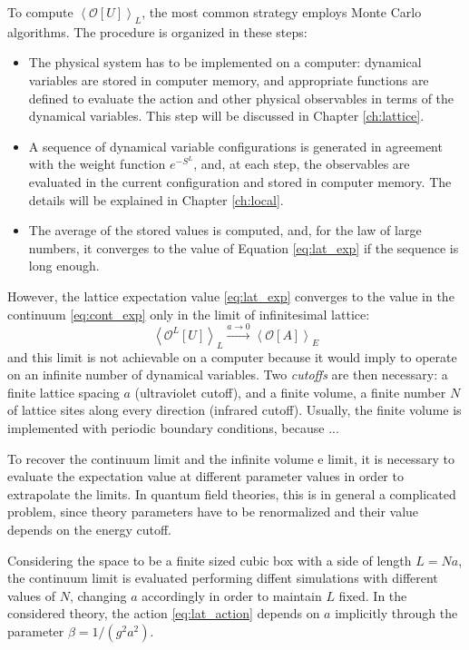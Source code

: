 To compute $\left<\mathcal O[U]\right>_L$, the most common strategy employs Monte Carlo algorithms.
The procedure is organized in these steps:
\begin{itemize}
    \item The physical system has to be implemented on a computer: dynamical variables are stored in computer memory,
        and appropriate functions are defined to evaluate the action and other physical observables in terms of the dynamical variables.
        This step will be discussed in Chapter \ref{ch:lattice}.
    \item A sequence of dynamical variable configurations is generated in agreement with the weight function $e^{-S^L}$, and, at each step,
        the observables are evaluated in the current configuration and stored in computer memory. The details will be explained in Chapter \ref{ch:local}.
    \item The average of the stored values is computed, and, for the law of large numbers,
        it converges to the value of Equation \ref{eq:lat_exp} if the sequence is long enough.
\end{itemize}

However, the lattice expectation value \eqref{eq:lat_exp} converges to the value in the continuum \eqref{eq:cont_exp} only in the limit of infinitesimal lattice:
\begin{equation}\label{eq:cont_limit}
    \left<\mathcal O^L[U]\right>_L \xrightarrow{a\to0} \left<\mathcal O[A]\right>_E
\end{equation}
and this limit is not achievable on a computer because it would imply to operate on an infinite number of dynamical variables.
Two \emph{cutoffs} are then necessary: a finite lattice spacing $a$ (ultraviolet cutoff),
and a finite volume, \ie a finite number $N$ of lattice sites along every direction (infrared cutoff).
Usually, the finite volume is implemented with periodic boundary conditions, because ... 

To recover the continuum limit and the infinite volume e limit,
it is necessary to evaluate the expectation value at different parameter values in order to extrapolate the limits.
In quantum field theories, this is in general a complicated problem,
since theory parameters have to be renormalized and their value depends on the energy cutoff.

Considering the space to be a finite sized cubic box with a side of length $L=Na$,
the continuum limit is evaluated performing diffent simulations with different values of $N$, changing $a$ accordingly in order to maintain $L$ fixed.
In the considered theory, the action \eqref{eq:lat_action} depends on $a$ implicitly through the parameter $\beta = 1/(g^2a^2)$.

